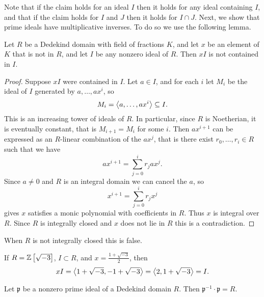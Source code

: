Note that if the claim holds for an ideal $ I $ then it holds for any ideal containing $ I $, and that if the claim holds for $ I $ and $ J $ then it holds for $ I \cap J $. Next, we show that prime ideals have multiplicative inverses. To do so we use the following lemma.

\begin{lemma}
\label{lem:11.1.7}
Let $ R $ be a Dedekind domain with field of fractions $ K $, and let $ x $ be an element of $ K $ that is not in $ R $, and let $ I $ be any nonzero ideal of $ R $. Then $ xI $ is not contained in $ I $.
\end{lemma}

\begin{proof}
Suppose $ xI $ were contained in $ I $. Let $ a \in I $, and for each $ i $ let $ M_i $ be the ideal of $ I $ generated by $ a, \dots, ax^i $, so
$$ M_i = \left\langle a, \dots, ax^i \right\rangle \subseteq I. $$
This is an increasing tower of ideals of $ R $. In particular, since $ R $ is Noetherian, it is eventually constant, that is $ M_{i + 1} = M_i $ for some $ i $. Then $ ax^{i + 1} $ can be expressed as an $ R $-linear combination of the $ ax^j $, that is there exist $ r_0, \dots, r_i \in R $ such that we have
$$ ax^{i + 1} = \sum_{j = 0}^i r_jax^j. $$
Since $ a \ne 0 $ and $ R $ is an integral domain we can cancel the $ a $, so
$$ x^{i + 1} = \sum_{j = 0}^i r_jx^j $$
gives $ x $ satisfies a monic polynomial with coefficients in $ R $. Thus $ x $ is integral over $ R $. Since $ R $ is integrally closed and $ x $ does not lie in $ R $ this is a contradiction.
\end{proof}

When $ R $ is not integrally closed this is false.

\begin{example2}
If $ R = \mathbb{Z}\left[ \sqrt{-3} \right] $, $ I \subset R $, and $ x = \tfrac{1 + \sqrt{-3}}{2} $, then
$$ xI = \left\langle 1 + \sqrt{-3}, -1 + \sqrt{-3} \right\rangle = \left\langle 2, 1 + \sqrt{-3} \right\rangle = I. $$
\end{example2}

\begin{proposition}
\label{prop:11.1.8}
Let $ \mathfrak{p} $ be a nonzero prime ideal of a Dedekind domain $ R $. Then $ \mathfrak{p}^{-1} \cdot \mathfrak{p} = R $.
\end{proposition}

